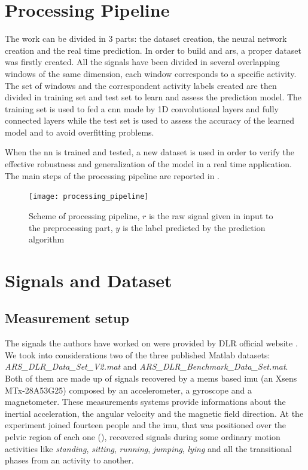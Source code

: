 
\section{Processing Pipeline}
\label{sec:processing_architecture}
The work can be divided in 3 parts: the dataset creation, the neural network creation and the real time prediction.
In order to build and \gls{ars}, a proper dataset was firstly created. All the signals have been divided in several overlapping windows of the same dimension, each window corresponds to a specific activity. The set of windows and the correspondent activity labels created are then divided in training set and test set to learn and assess the prediction model.
The training set is used to fed a \gls{cnn} made by 1D convolutional layers and fully connected layers while the test set is used to assess the accuracy of the learned model and to avoid overfitting problems.

When the \gls{nn} is trained and tested, a new dataset is used in order to verify the effective robustness and generalization of the model in a real time application.
The main steps of the processing pipeline are reported in .

\begin{figure}[htp]
\texttt{[image: processing\_pipeline]}
\caption{Scheme of processing pipeline, $r$ is the raw signal given in input to the preprocessing part, $y$ is the label predicted by the prediction algorithm}
\label{fig:processing_pipeline}
\end{figure}


\section{Signals and Dataset}
\label{sec:model}

\subsection{Measurement setup}
The signals the authors have worked on were provided by DLR official website \cite{DLR}. We took into considerations two of the three published Matlab datasets: \textit{ARS\_DLR\_Data\_Set\_V2.mat} and \textit{ARS\_DLR\_Benchmark\_Data\_Set.mat}.
Both of them are made up of signals recovered by a \gls{mems} based \gls{imu} (an Xsens MTx-28A53G25) composed by an accelerometer, a gyroscope and a magnetometer. These measurements systems provide informations about the inertial acceleration, the angular velocity and the magnetic field direction.
At the experiment joined fourteen people and the \gls{imu}, that was positioned over the pelvic region of each one (), recovered signals during some ordinary motion activities like \textit{standing}, \textit{sitting}, \textit{running}, \textit{jumping}, \textit{lying} and all the transitional phases from an activity to another.

